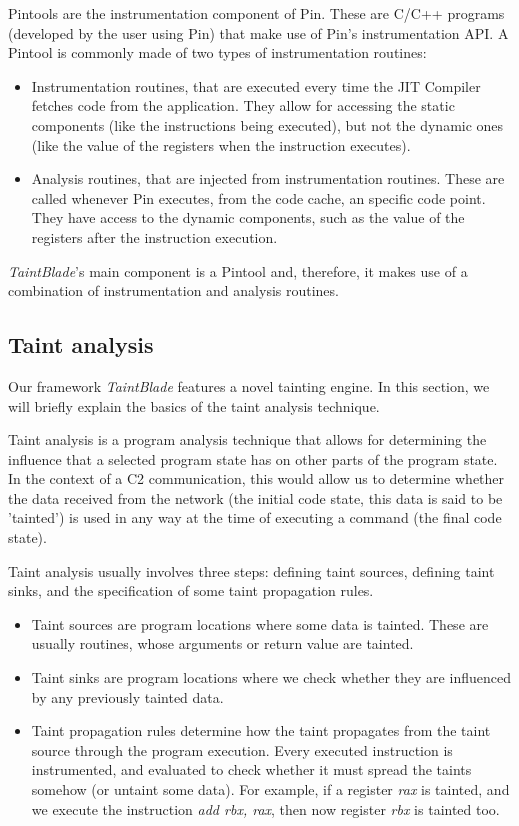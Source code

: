 \documentclass[conference]{IEEEtran}
\begin{document}
Pintools are the instrumentation component of Pin. These are C/C++ programs
(developed by the user using Pin) that make use of Pin's instrumentation API. A
Pintool is commonly made of two types of instrumentation routines:
\begin{itemize}
    \item Instrumentation routines, that are executed every time the JIT Compiler fetches
          code from the application. They allow for accessing the static components (like
          the instructions being executed), but not the dynamic ones (like the value of
          the registers when the instruction executes).
    \item Analysis routines, that are injected from instrumentation routines. These are
          called whenever Pin executes, from the code cache, an specific code point. They
          have access to the dynamic components, such as the value of the registers after
          the instruction execution.
\end{itemize}

\textit{TaintBlade}'s main component is a Pintool and, therefore, it makes use of a combination of
instrumentation and analysis routines.

\subsection {Taint analysis}\label{subsec:taint_analysis}
Our framework \textit{TaintBlade} features a novel tainting engine. In this
section, we will briefly explain the basics of the taint analysis technique.

Taint analysis is a program analysis technique that allows for determining the
influence that a selected program state has on other parts of the program
state\cite{book_practical_binary_analysis}. In the context of a C2
communication, this would allow us to determine whether the data received from
the network (the initial code state, this data is said to be 'tainted') is used
in any way at the time of executing a command (the final code state).

Taint analysis usually involves three steps: defining taint sources, defining
taint sinks, and the specification of some taint propagation rules.
\begin{itemize}
    \item Taint sources are program locations where some data is tainted. These are
          usually routines, whose arguments or return value are tainted.
    \item Taint sinks are program locations where we check whether they are influenced by
          any previously tainted data.
    \item Taint propagation rules determine how the taint propagates from the taint
          source through the program execution. Every executed instruction is
          instrumented, and evaluated to check whether it must spread the taints somehow
          (or untaint some data). For example, if a register \textit{rax} is tainted, and
          we execute the instruction \textit{add rbx, rax}, then now register
          \textit{rbx} is tainted too.
\end{itemize}
\end{document}
